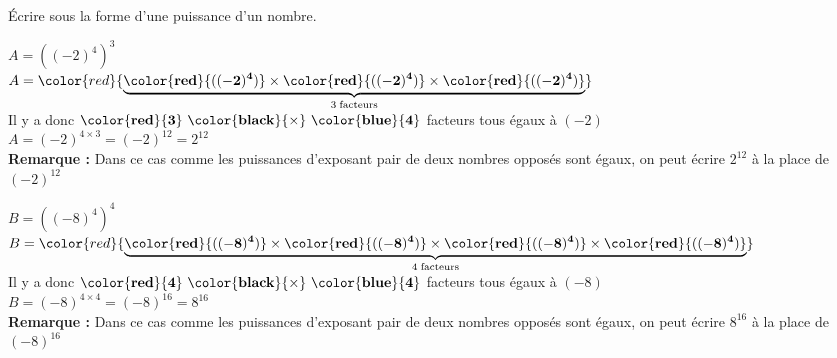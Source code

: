     Écrire sous la forme d'une puissance d'un nombre.



            \begin{itemize}
                \def\item{} %
                \item  $A=\left((-2)^4\right)^{3}$\\
                $A=\color{red}{\underbrace{\mathbf{\color{red}{((-2)^4)}} \times \mathbf{\color{red}{((-2)^4)}}\times \mathbf{\color{red}{((-2)^4)}}}_{3\thickspace\text{facteurs}}}$\\
                Il y a donc $\mathbf{\color{red}{3}~\color{black}{\times}~\color{blue}{4}}$ facteurs tous égaux à $(-2)$\\
                $A=(-2)^{4\times3} = (-2)^{12}=  2^{12}$\\
                \textbf{Remarque : } Dans ce cas comme les puissances d'exposant pair de deux nombres opposés sont égaux, on peut écrire $ 2^{12}$ à la place de $(-2)^{12}$

                \bigskip
                \item $B=\left((-8)^4\right)^{4}$\\
                $B=\color{red}{\underbrace{\mathbf{\color{red}{((-8)^4)}} \times \mathbf{\color{red}{((-8)^4)}}\times \mathbf{\color{red}{((-8)^4)}}\times \mathbf{\color{red}{((-8)^4)}}}_{4\thickspace\text{facteurs}}}$\\
                Il y a donc $\mathbf{\color{red}{4}~\color{black}{\times}~\color{blue}{4}}$ facteurs tous égaux à $(-8)$\\
                $B=(-8)^{4\times4} = (-8)^{16}=  8^{16}$\\
                \textbf{Remarque : } Dans ce cas comme les puissances d'exposant pair de deux nombres opposés sont égaux, on peut écrire $ 8^{16}$ à la place de $(-8)^{16}$
            \end{itemize}
            \Coupe
